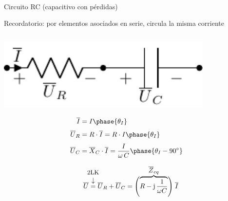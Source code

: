 \documentclass[aspectratio=169, usenames,svgnames,dvipsnames]{beamer}
\begin{document}

\begin{frame}{Circuito RC \hspace{3mm}(capacitivo con pérdidas)}

    \vspace{3mm}
    \alert{Recordatorio}: por elementos asociados en \alert{serie}, circula la \alert{misma corriente}

    \vspace{1mm}
    \begin{columns}
    \begin{column}{0.5\columnwidth}
    
        \vspace{-3mm}
        \begin{center}
            \hspace*{12mm}\includegraphics[width=0.81\textwidth]{../figs/RC.pdf}
        \end{center}

        \vspace{-8mm}
        \begin{align*}
            \overline{I} &= I\phase{\theta_I}\\[3pt]
            \overline{U}_R &= R \cdot \overline{I}=R\cdot I\phase{\theta_I}\\[3pt]
        	\overline{U}_C &= \overline{X}_C\cdot\overline{I}= \dfrac{I}{\omega\,C}\phase{\theta_I\ang{-90}}
        \end{align*}
        
        \vspace{-4mm}
        \begin{equation*}
          \quad\; \overline{U} \overarrow[=][\downarrow]{\small 2LK} \overline{U}_R + \overline{U}_C = 
          \Biggl( \overbrace{ R - \mathrm{j}\,\dfrac{1}{\omega C} }^{\textstyle \overline{Z}_{eq}} \Biggl) \; \overline{I}
        \end{equation*}
    \end{column}    
    

\end{columns}
\end{frame}
\end{document}
